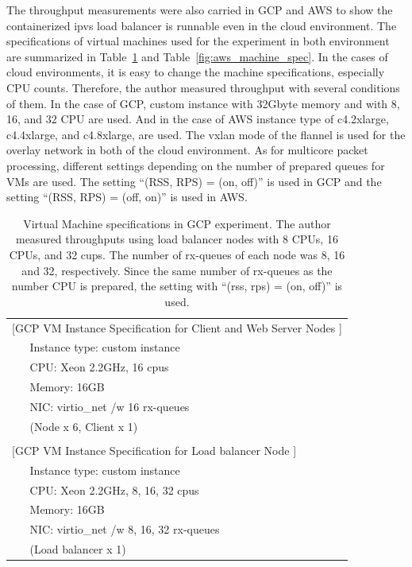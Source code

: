 The throughput measurements were also carried  in GCP and AWS to show the containerized ipvs load balancer is runnable even in the cloud environment.
The specifications of virtual machines used for the experiment in both environment are summarized in Table~\ref{fig:gcp_machine_spec} and Table~\ref{fig:aws_machine_spec}.
In the cases of cloud environments, it is easy to change the machine specifications, especially CPU counts.
Therefore, the author measured throughput with several conditions of them.
In the case of GCP, custom instance with 32Gbyte memory and with 8, 16, and 32 CPU are used.
And in the case of AWS instance type of c4.2xlarge, c4.4xlarge, and c4.8xlarge, are used.
The vxlan mode of the flannel is used for the overlay network in both of the cloud environment.
As for multicore packet processing, different settings depending on the number of prepared queues for VMs are used. 
The setting \enquote{(RSS, RPS) = (on, off)} is used in GCP and the setting \enquote{(RSS, RPS) = (off, on)} is used in AWS.

{
\setlength{\tabcolsep}{3em}
\renewcommand{\arraystretch}{1.1}

\begin{table}[h]
  \centering
  \begin{tabular}{ll}
    \hline 
    \multicolumn{2}{l}{[GCP VM Instance Specification for Client and Web Server Nodes ]}   \\
    & Instance type: custom instance \\
    & CPU: Xeon 2.2GHz, 16 cpus \hspace{2cm} \\
    & Memory: 16GB \\
    & NIC: virtio\_net /w 16 rx-queues \\
    & (Node x 6, Client x 1) \\
    & \\
    \multicolumn{2}{l}{[GCP VM Instance Specification for Load balancer Node ]}   \\
    & Instance type: custom instance \\
    & CPU: Xeon 2.2GHz, 8, 16, 32 cpus \hspace{2cm} \\
    & Memory: 16GB \\
    & NIC: virtio\_net /w 8, 16, 32 rx-queues \\
    & (Load balancer x 1) \\
    \hline
  \end{tabular}
  \par\bigskip
  \centering
  \begin{minipage}{0.9\columnwidth}
    \caption[Virtual Machine specifications in GCP experiment]{
Virtual Machine specifications in GCP experiment.
The author measured throughputs using load balancer nodes with 8 CPUs, 16 CPUs, and 32 cups.
The number of rx-queues of each node was 8, 16 and 32, respectively.
Since the same number of rx-queues as the number CPU is prepared, the setting with \enquote{(rss, rps) = (on, off)} is used.
    }
    \label{fig:gcp_machine_spec}
  \end{minipage}
\end{table}
}


